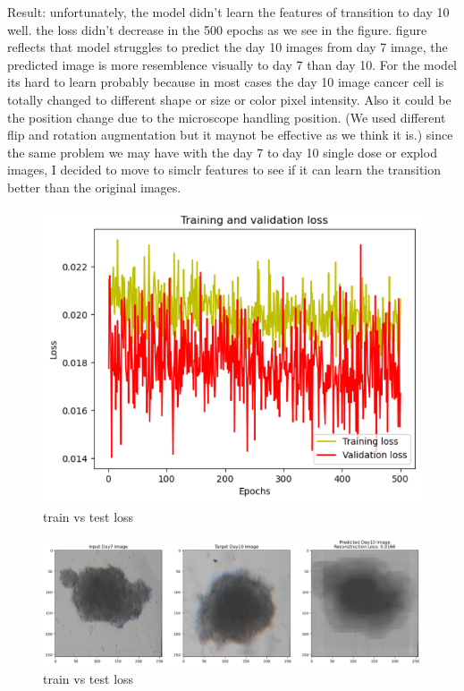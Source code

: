Result: 
unfortunately, the model didn't learn the features of transition to day 10 well. the loss didn't decrease in the 500 epochs as we see in the figure.  figure reflects that
model struggles to predict the day 10 images from day 7 image, the predicted image is more resemblence visually to day 7 than day 10. For the model its hard to learn probably because in most cases the day 10 image cancer cell is totally changed to different 
shape or size or color pixel intensity. Also it could be the position change due to the microscope handling position. (We used different flip and rotation 
augmentation but it maynot be effective as we think it is.) since the same problem we may have with the day 7 to day 10 single dose or explod images, I decided to move to
simclr features to see if it can learn the transition better than the original images. 

\begin{figure}[H]
  \centering
  \includegraphics[scale=0.46]{figures/rankloss.png} 
  \caption{train vs test loss}
  \label{fig:uloss}
\end{figure}

\begin{figure}[H]
  \centering
  \includegraphics[scale=0.46]{figures/unpred.png} 
  \caption{train vs test loss}
  \label{fig:unloss}
\end{figure}

